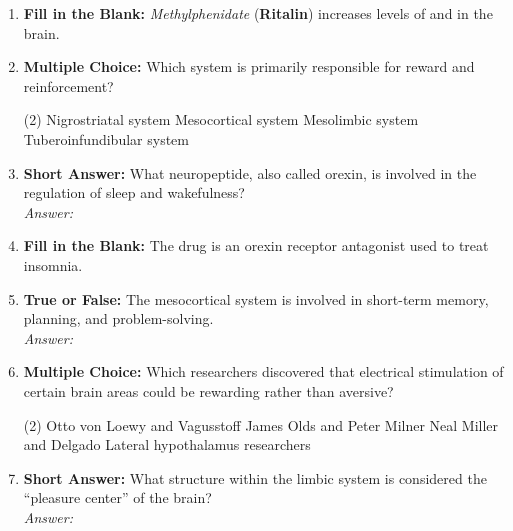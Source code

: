 \begin{enumerate}[label=\textbf{Q3.5.\arabic*}]
    \item \textbf{Fill in the Blank:} \textit{Methylphenidate} (\textbf{Ritalin}) increases levels of \underline{\hspace{3cm}} and \underline{\hspace{3cm}} in the brain.

    \item \textbf{Multiple Choice:} Which system is primarily responsible for reward and reinforcement?
        \begin{tasks}[label=\textcolor{\documentTheme}{(\Alph*)}, item-format=\color{\documentTheme}, label-width=1.5em, item-indent=1.7em](2)
            \task Nigrostriatal system
            \task Mesocortical system
            \task Mesolimbic system
            \task Tuberoinfundibular system
        \end{tasks}

    \item \textbf{Short Answer:} What neuropeptide, also called orexin, is involved in the regulation of sleep and wakefulness? \\
        \textit{Answer:} %

    \item \textbf{Fill in the Blank:} The drug \underline{\hspace{3cm}} is an orexin receptor antagonist used to treat insomnia.

    \item \textbf{True or False:} The mesocortical system is involved in short-term memory, planning, and problem-solving. \\
        \textit{Answer:} %

    \item \textbf{Multiple Choice:} Which researchers discovered that electrical stimulation of certain brain areas could be rewarding rather than aversive?
        \begin{tasks}[label=\textcolor{\documentTheme}{(\Alph*)}, item-format=\color{\documentTheme}, label-width=1.5em, item-indent=1.7em](2)
            \task Otto von Loewy and Vagusstoff
            \task James Olds and Peter Milner
            \task Neal Miller and Delgado
            \task Lateral hypothalamus researchers
        \end{tasks}

    \item \textbf{Short Answer:} What structure within the limbic system is considered the ``pleasure center'' of the brain? \\
        \textit{Answer:} %


\end{enumerate}
